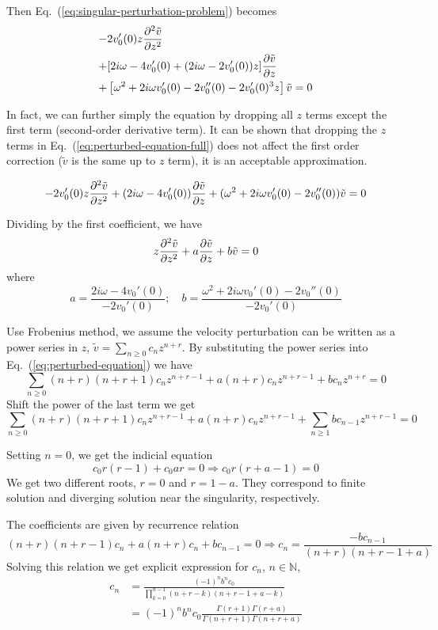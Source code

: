 Then Eq.~(\ref{eq:singular-perturbation-problem}) becomes
\begin{equation} \label{eq:perturbed-equation-full}
	\begin{aligned}
		- & 2v_0'(0)z\pdv[2]{\tilde{v}}{z}                                              \\
		+ & [2i\omega - 4v_0'(0) + (2i\omega - 2v_0'(0))z]\pdv{\tilde{v}}{z}            \\
		+ & \left[\omega^2 + 2i\omega v_0'(0) - 2v_0''(0) - 2v_0'(0)^3z\right]\tilde{v}
		= 0
	\end{aligned}
\end{equation}

In fact, we can further simply the equation by dropping all $z$ terms except the first term (second-order derivative term). It can be shown that dropping the $z$ terms in Eq.~(\ref{eq:perturbed-equation-full}) does not affect the first order correction ($\tilde{v}$ is the same up to $z$ term), it is an acceptable approximation.

\[ - 2v_0'(0)z\pdv[2]{\tilde{v}}{z}
	+ (2i\omega - 4v_0'(0))\pdv{\tilde{v}}{z}
	+ (\omega^2 + 2i\omega v_0'(0) - 2v_0''(0))\tilde{v}
	= 0 \]

Dividing by the first coefficient, we have
\begin{equation}
	z\pdv[2]{\tilde{v}}{z} + a\pdv{\tilde{v}}{z} + b\tilde{v} = 0
	\label{eq:perturbed-equation}
\end{equation}
where
\[ a = \frac{2i\omega - 4v_0'(0)}{-2v_0'(0)}; \quad
	b = \frac{\omega^2 + 2i\omega v_0'(0) - 2v_0''(0)}{-2v_0'(0)}
\]

Use Frobenius method, we assume the velocity perturbation can be written as a power series in $z$,  $\tilde{v} = \sum_{n\geq 0}c_nz^{n+r}$. By substituting the power series into Eq.~(\ref{eq:perturbed-equation}) we have
\[ \sum_{n \geq 0} (n+r)(n+r+1) c_n z^{n+r-1} + a(n+r)c_nz^{n+r-1} + bc_nz^{n+r} = 0\]
Shift the power of the last term we get
\[ \sum_{n \geq 0} (n+r)(n+r+1) c_n z^{n+r-1} + a(n+r)c_nz^{n+r-1} + \sum_{n \geq 1} bc_{n-1}z^{n+r-1} = 0\]

Setting $n=0$, we get the indicial equation
\[ c_0 r(r-1) + c_0 ar = 0 \Rightarrow c_0r(r+a-1) = 0 \]
We get two different roots, $r=0$ and $r=1-a$. They correspond to finite solution and diverging solution near the singularity, respectively.

The coefficients are given by recurrence relation
\[ (n+r)(n+r-1)c_n + a(n+r)c_n + bc_{n-1} = 0
	\Rightarrow
	c_n = \frac{-bc_{n-1}}{(n+r)(n+r-1+a)}
\]
Solving this relation we get explicit expression for $c_n$, $n\in\mathbb{N}$,
\begin{equation}
	\begin{aligned}
		c_n & = \frac{(-1)^n b^n c_0}{\prod_{k=0}^{n-1} (n+r-k)(n+r-1+a-k)}              \\
		    & = (-1)^n b^n c_0 \frac{\Gamma(r+1)\Gamma(r+a)}{\Gamma(n+r+1)\Gamma(n+r+a)}
	\end{aligned}
	\label{eq:coefficient}
\end{equation}

